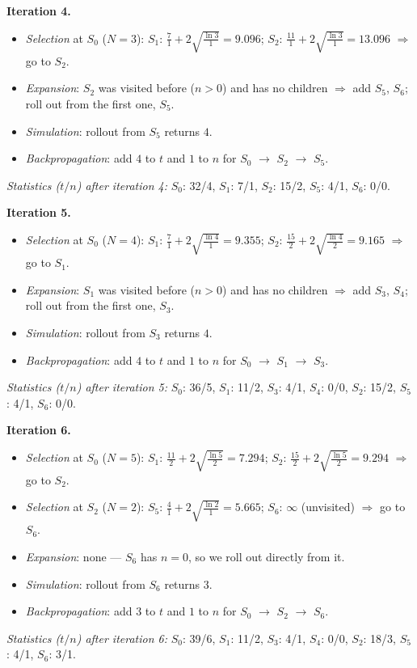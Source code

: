 \documentclass[11pt,a4paper]{article}
\begin{document}
\begin{solbox}
\smallskip
\textbf{Iteration 4.}
\begin{itemize}[leftmargin=1.5em,itemsep=1pt]
\item \emph{Selection} at $S_{0}$ ($N=3$): $S_{1}$: $\frac{7}{1} + 2\sqrt{\frac{\ln 3}{1}} = 9.096$; $S_{2}$: $\frac{11}{1} + 2\sqrt{\frac{\ln 3}{1}} = 13.096$ $\Rightarrow$ go to \textbf{$S_{2}$}.
\item \emph{Expansion}: $S_{2}$ was visited before ($n>0$) and has no children $\Rightarrow$ add $S_{5}$, $S_{6}$; roll out from the first one, \textbf{$S_{5}$}.
\item \emph{Simulation}: rollout from $S_{5}$ returns $4$.
\item \emph{Backpropagation}: add $4$ to $t$ and $1$ to $n$ for $S_{0}$ $\to$ $S_{2}$ $\to$ $S_{5}$.
\end{itemize}
\textit{Statistics ($t/n$) after iteration 4:} $S_{0}$: 32/4, $S_{1}$: 7/1, $S_{2}$: 15/2, $S_{5}$: 4/1, $S_{6}$: 0/0.

\smallskip
\textbf{Iteration 5.}
\begin{itemize}[leftmargin=1.5em,itemsep=1pt]
\item \emph{Selection} at $S_{0}$ ($N=4$): $S_{1}$: $\frac{7}{1} + 2\sqrt{\frac{\ln 4}{1}} = 9.355$; $S_{2}$: $\frac{15}{2} + 2\sqrt{\frac{\ln 4}{2}} = 9.165$ $\Rightarrow$ go to \textbf{$S_{1}$}.
\item \emph{Expansion}: $S_{1}$ was visited before ($n>0$) and has no children $\Rightarrow$ add $S_{3}$, $S_{4}$; roll out from the first one, \textbf{$S_{3}$}.
\item \emph{Simulation}: rollout from $S_{3}$ returns $4$.
\item \emph{Backpropagation}: add $4$ to $t$ and $1$ to $n$ for $S_{0}$ $\to$ $S_{1}$ $\to$ $S_{3}$.
\end{itemize}
\textit{Statistics ($t/n$) after iteration 5:} $S_{0}$: 36/5, $S_{1}$: 11/2, $S_{3}$: 4/1, $S_{4}$: 0/0, $S_{2}$: 15/2, $S_{5}$: 4/1, $S_{6}$: 0/0.

\smallskip
\textbf{Iteration 6.}
\begin{itemize}[leftmargin=1.5em,itemsep=1pt]
\item \emph{Selection} at $S_{0}$ ($N=5$): $S_{1}$: $\frac{11}{2} + 2\sqrt{\frac{\ln 5}{2}} = 7.294$; $S_{2}$: $\frac{15}{2} + 2\sqrt{\frac{\ln 5}{2}} = 9.294$ $\Rightarrow$ go to \textbf{$S_{2}$}.
\item \emph{Selection} at $S_{2}$ ($N=2$): $S_{5}$: $\frac{4}{1} + 2\sqrt{\frac{\ln 2}{1}} = 5.665$; $S_{6}$: $\infty$ (unvisited) $\Rightarrow$ go to \textbf{$S_{6}$}.
\item \emph{Expansion}: none --- \textbf{$S_{6}$} has $n=0$, so we roll out directly from it.
\item \emph{Simulation}: rollout from $S_{6}$ returns $3$.
\item \emph{Backpropagation}: add $3$ to $t$ and $1$ to $n$ for $S_{0}$ $\to$ $S_{2}$ $\to$ $S_{6}$.
\end{itemize}
\textit{Statistics ($t/n$) after iteration 6:} $S_{0}$: 39/6, $S_{1}$: 11/2, $S_{3}$: 4/1, $S_{4}$: 0/0, $S_{2}$: 18/3, $S_{5}$: 4/1, $S_{6}$: 3/1.


\end{solbox}
\end{document}
